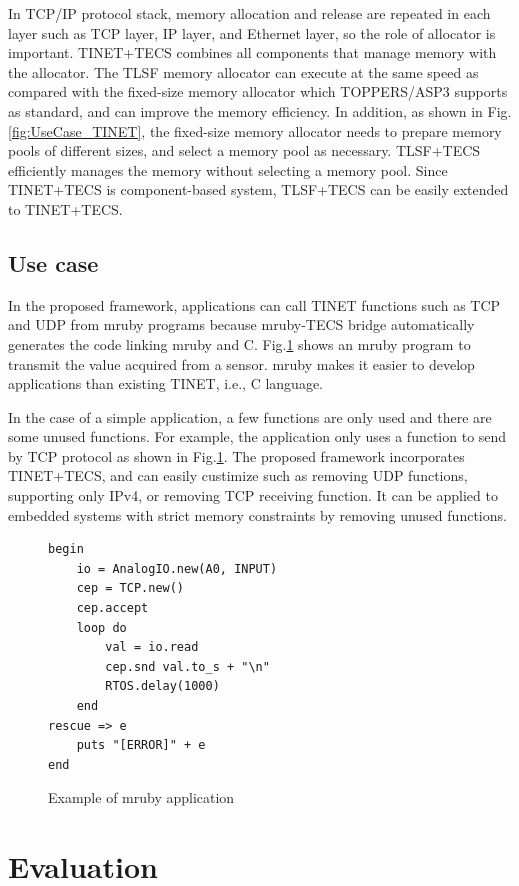 \documentclass[JIP]{ipsj_v2/UTF8/ipsj}
\begin{document}
In TCP/IP protocol stack, memory allocation and release are repeated in each layer such as TCP layer, IP layer, and Ethernet layer, so the role of allocator is important.
TINET+TECS combines all components that manage memory with the allocator.
The TLSF memory allocator can execute at the same speed as compared with the fixed-size memory allocator which TOPPERS/ASP3 supports as standard, and can improve the memory efficiency.
In addition, as shown in Fig.\ref{fig:UseCase_TINET}, the fixed-size memory allocator needs to prepare memory pools of different sizes, and select a memory pool as necessary.
TLSF+TECS efficiently manages the memory without selecting a memory pool.
Since TINET+TECS is component-based system, TLSF+TECS can be easily extended to TINET+TECS.

\subsection{Use case}
\label{sec:UseCase}

In the proposed framework, applications can call TINET functions such as TCP and UDP from mruby programs because mruby-TECS bridge automatically generates the code linking mruby and C.
Fig.\ref{src:mruby} shows an mruby program to transmit the value acquired from a sensor.
mruby makes it easier to develop applications than existing TINET, i.e., C language.

In the case of a simple application, a few functions are only used and there are some unused functions.
For example, the application only uses a function to send by TCP protocol as shown in Fig.\ref{src:mruby}.
The proposed framework incorporates TINET+TECS, and can easily custimize such as removing UDP functions, supporting only IPv4, or removing TCP receiving function.
It can be applied to embedded systems with strict memory constraints by removing unused functions.


\begin{figure}[t]
\centering
\begin{lstlisting}
begin
    io = AnalogIO.new(A0, INPUT)
    cep = TCP.new()	
    cep.accept
    loop do		
        val = io.read  
        cep.snd val.to_s + "\n"		
        RTOS.delay(1000)			
    end
rescue => e	
    puts "[ERROR]" + e
end
\end{lstlisting}
\caption{Example of mruby application}
\label{src:mruby}
\end{figure}


\section{Evaluation}
\label{sec:Evaluation}
\end{document}

